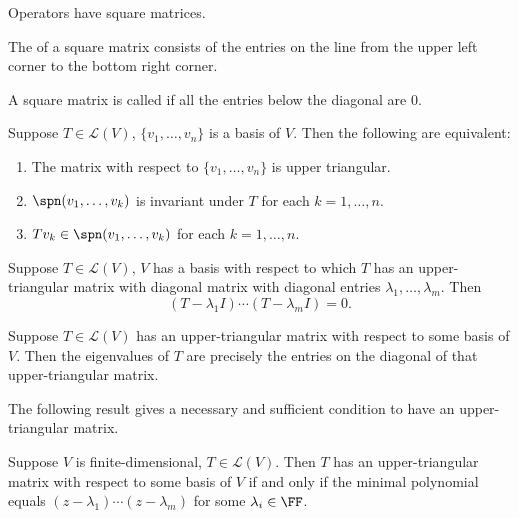 \begin{remark}
Operators have square matrices.
\end{remark}

\begin{definition}
The  of a square matrix consists of the entries on the line from the upper left corner to the bottom right corner.
\end{definition}

\begin{definition}
A square matrix is called  if all the entries below the diagonal are $0$.
\end{definition}

\begin{lemma}
Suppose $T\in\mathcal{L}(V)$, $\{v_1,\dots,v_n\}$ is a basis of $V$. Then the following are equivalent:
\begin{enumerate}[label=(\roman*)]
\item The matrix with respect to $\{v_1,\dots,v_n\}$ is upper triangular.
\item $\spn(v_1,\dots,v_k)$ is invariant under $T$ for each $k=1,\dots,n$.
\item $Tv_k\in\spn(v_1,\dots,v_k)$ for each $k=1,\dots,n$.
\end{enumerate}
\end{lemma}

\begin{lemma}
Suppose $T\in\mathcal{L}(V)$, $V$ has a basis with respect to which $T$ has an upper-triangular matrix with diagonal matrix with diagonal entries $\lambda_1,\dots,\lambda_m$. Then
\[(T-\lambda_1I)\cdots(T-\lambda_mI)=0.\]
\end{lemma}

\begin{proposition}
Suppose $T\in\mathcal{L}(V)$ has an upper-triangular matrix with respect to some basis of $V$. Then the eigenvalues of $T$ are precisely the entries on the diagonal of that upper-triangular matrix.
\end{proposition}

The following result gives a necessary and sufficient condition to have an upper-triangular matrix.

\begin{lemma}
Suppose $V$ is finite-dimensional, $T\in\mathcal{L}(V)$. Then $T$ has an upper-triangular matrix with respect to some basis of $V$ if and only if the minimal polynomial equals $(z-\lambda_1)\cdots(z-\lambda_m)$ for some $\lambda_i\in\FF$.
\end{lemma}

